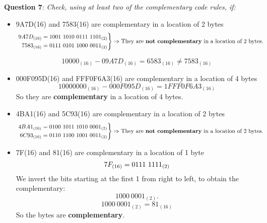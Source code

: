 \documentclass{article}
\newcommand{\question}[2][]{\begin{flushleft}
        \textbf{Question #1}: \textit{#2}


\end{flushleft}}
\begin{document}
	\question[7]{Check, using at least two of the complementary code rules, if:}
		\begin{itemize}
			\item 9A7D(16) and 7583(16) are complementary in a location of 2 bytes
			\begin{equation*}
				\begin{aligned}
					&\left.\begin{aligned}
						9A7D_{(16)} = 1001\ 1010\ 0111\ 1101_{(2)} \\
						7583_{(16)} = 0111\ 0101\ 1000\ 0011_{(2)} \\ 
					\end{aligned}\right\}\Rightarrow\text{They are \textbf{not complementary} in a location of 2 bytes.}
				\end{aligned}
			\end{equation*}
			
			\begin{equation*}
				10000_{(16)} - 09A7D_{(16)} = 	6583_{(16)} \neq 7583_{(16)}
			\end{equation*}

				
			\item 000F095D(16) and FFF0F6A3(16) are complementary in a location of 4 bytes
			\begin{equation*}
				10000000_{(16)} - 000F095D_{(16)} = 1FFF0F6A3_{(16)} 
			\end{equation*}
			So they are \textbf{complementary} in a location of 4 bytes.

			\item 4BA1(16)  and 5C93(16) are complementary in a location of 2 bytes
			\begin{equation*}
				\begin{aligned}
					&\left.\begin{aligned}
						 4BA1_{(16)} = 0100\ 1011\ 1010\ 0001_{(2)} \\
						 6C93_{(16)} = 0110\ 1100\ 1001\ 0011_{(2)} \\
					\end{aligned}\right\}\Rightarrow\text{They are \textbf{not complementary} in a location of 2 bytes.}
				\end{aligned}
			\end{equation*}
			
			\item 7F(16) and 81(16) are complementary in a location of 1 byte
			\begin{equation*}
				7F_{(16)} = 0111\ 1111_{(2)} \\
			\end{equation*}
				We invert the bits starting at the first 1 from right to left, to obtain the complementary: \begin{equation*} 1000\ 0001_{(2)}. \end{equation*}
			\begin{equation*}
				1000\ 0001_{(2)} = 81_{(16)}
			\end{equation*}
				So the bytes are \textbf{complementary}.


\end{itemize}
\end{document}
